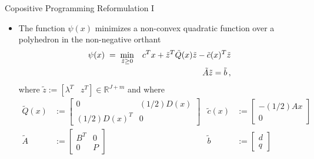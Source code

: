 \documentclass[xcolor=x11names,compress]{beamer}
\renewcommand{\(}{\begin{columns}}
\renewcommand{\)}{\end{columns}}
\newcommand{\<}[1]{\begin{column}{#1}}
\renewcommand{\>}{\end{column}}
\def\min{\mathop{\rm min}}
\newcommand{\0}{\V{0}}
\newcommand{\1}{\V{1}}
\renewcommand{\Re}{\mathbb{R}}
\newcommand{\tQ}{\tilde{Q}(x)}
\newcommand{\tq}{\tilde{c}(x)}
\newcommand{\tA}{\tilde{A}}
\newcommand{\tb}{\tilde{b}}
\newcommand{\ty}{\tilde{z}}
\begin{document}
\begin{frame}{Copositive Programming Reformulation I}
\begin{itemize}
\item The function $\psi(x)$ minimizes a non-convex quadratic function over a polyhedron in the non-negative orthant
\begin{eqnarray*}
\psi(x) \;=\;\min_{\ty\geq 0} &&c^Tx+ \ty^T \tQ \ty-\tq^T\ty\\
&&\tA \ty= \tb\,,
\end{eqnarray*}
where $\ty:=[\lambda^T \;\;\;z^T]\in\Re^{J+m}$ and where
\begin{align*}
\tQ &:= \left[\begin{array}{cc}0 & (1/2)D(x) \\ (1/2)D(x)^T & 0  \end{array}\right] & \tq &:= \left[\begin{array}{c} -(1/2)A x\\ 0\end{array}\right]\\
\tA &:= \left[\begin{array}{cccc}B^T & 0 \\ 0 &P \end{array}\right] & \tb &:= \left[\begin{array}{c}d \\ q\end{array}\right]
\end{align*}
\end{itemize}
\end{frame}
\end{document}
